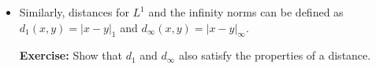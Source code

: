\begin{itemize}
\begin{example}
\begin{proof}
                  We know that for any $\epsilon > 0,$ we have $\lVert x-y\rVert_b < \delta_b \implies |f(x)-f(y)| < \epsilon.$ Let us pick $\delta = \frac{\delta_b}{c}$. Then we have:
                  \begin{align}
                      \lVert x-y\rVert_a < \frac{\delta_b}{c} &\implies c\lVert x-y\rVert_a < \delta_b \\ 
                      &\implies \lVert x-y\rVert_b \le c\lVert x-y\rVert_a < \delta_b \\ 
                      &\implies |f(x)-f(y)| < \epsilon 
                  \end{align}
              \end{proof}
          \end{example}
    \item Similarly, distances for $L^1$ and the infinity norms can be defined as $d_1(x,y)=|x-y|_1$ and $d_\infty(x,y)=|x-y|_\infty$.

          \textbf{Exercise:} Show that $d_1$ and $d_\infty$ also satisfy the properties of a distance.


\end{itemize}
